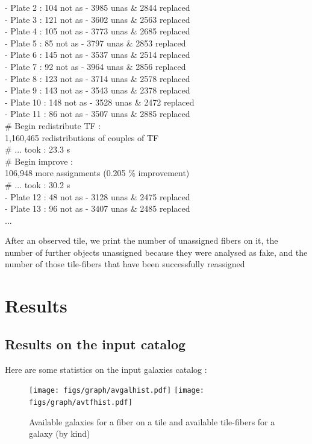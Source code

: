 \documentclass{article}
\begin{document}
{ - Plate 2 :   104 not as -  3985 unas \& 2844 replaced \\
 - Plate 3 :   121 not as -  3602 unas \& 2563 replaced \\
 - Plate 4 :   105 not as -  3773 unas \& 2685 replaced \\
 - Plate 5 :    85 not as -  3797 unas \& 2853 replaced \\
 - Plate 6 :   145 not as -  3537 unas \& 2514 replaced \\
 - Plate 7 :    92 not as -  3964 unas \& 2856 replaced \\
 - Plate 8 :   123 not as -  3714 unas \& 2578 replaced \\
- Plate 9 :   143 not as -  3543 unas \& 2378 replaced \\
- Plate 10 :   148 not as -  3528 unas \& 2472 replaced \\
- Plate 11 :    86 not as -  3507 unas \& 2885 replaced \\
\# Begin redistribute TF : \\
  1,160,465 redistributions of couples of TF \\
\# ... took : 23.3 s \\
\# Begin improve : \\
  106,948 more assignments (0.205 \% improvement) \\
\# ... took : 30.2 s \\
- Plate 12 :   48 not as -  3128 unas \& 2475 replaced \\
- Plate 13 :    96 not as -  3407 unas \& 2485 replaced \\
...\\
}

After an observed tile, we print the number of unassigned fibers on it, the number of further objects unassigned because they were analysed as fake, and the number of those tile-fibers that have been successfully reassigned

\section{Results}
\subsection{Results on the input catalog}
Here are some statistics on the input galaxies catalog :

\begin{figure}[H]\begin{center}
	\texttt{[image: figs/graph/avgalhist.pdf]}
	\texttt{[image: figs/graph/avtfhist.pdf]}\hfill
	\caption{Available galaxies for a fiber on a tile and available tile-fibers for a galaxy (by kind)}\label{avtfhist}
\end{center}\end{figure}
\end{document}
